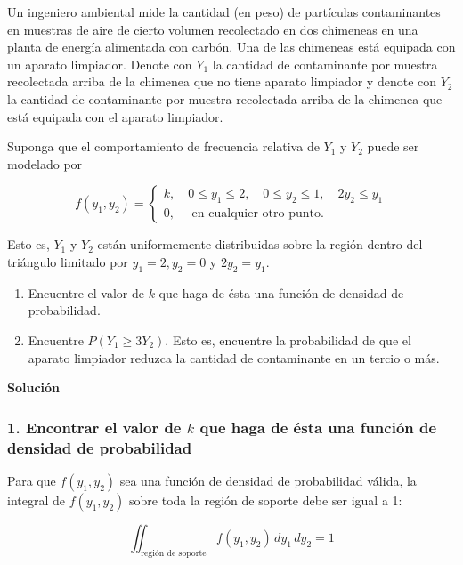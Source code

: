 \documentclass[
]{article}
\providecommand{\tightlist}{%
  \setlength{\itemsep}{0pt}\setlength{\parskip}{0pt}}
\begin{document}
Un ingeniero ambiental mide la cantidad (en peso) de partículas contaminantes en muestras de aire de cierto volumen recolectado en dos chimeneas en una planta de energía alimentada con carbón. Una de las chimeneas está equipada con un aparato limpiador. Denote con \(Y_{1}\) la cantidad de contaminante por muestra recolectada arriba de la chimenea que no tiene aparato limpiador y denote con \(Y_{2}\) la cantidad de contaminante por muestra recolectada arriba de la chimenea que está equipada con el aparato limpiador.

Suponga que el comportamiento de frecuencia relativa de \(Y_{1}\) y \(Y_{2}\) puede ser modelado por

\[
f\left(y_{1}, y_{2}\right)=\left\{\begin{array}{l}
k, \quad 0 \leq y_{1} \leq 2, \quad 0 \leq y_{2} \leq 1, \quad 2 y_{2} \leq y_{1} \\
0, \quad \text { en cualquier otro punto. }
\end{array}\right.
\]

Esto es, \(Y_{1}\) y \(Y_{2}\) están uniformemente distribuidas sobre la región dentro del triángulo limitado por \(y_{1}=2, y_{2}=0\) y \(2 y_{2}=y_{1}\).

\begin{enumerate}
\def\labelenumi{\arabic{enumi}.}
\tightlist
\item
  Encuentre el valor de \(k\) que haga de ésta una función de densidad de probabilidad.
\item
  Encuentre \(P\left(Y_{1} \geq 3 Y_{2}\right)\). Esto es, encuentre la probabilidad de que el aparato limpiador reduzca la cantidad de contaminante en un tercio o más.
\end{enumerate}

\textbf{Solución}

\subsubsection{\texorpdfstring{1. Encontrar el valor de \(k\) que haga de ésta una función de densidad de probabilidad}{1. Encontrar el valor de k que haga de ésta una función de densidad de probabilidad}}\label{encontrar-el-valor-de-k-que-haga-de-uxe9sta-una-funciuxf3n-de-densidad-de-probabilidad}

Para que \(f(y_1, y_2)\) sea una función de densidad de probabilidad válida, la integral de \(f(y_1, y_2)\) sobre toda la región de soporte debe ser igual a 1:

\[
\iint_{\text{región de soporte}} f(y_1, y_2) \, dy_1 \, dy_2 = 1
\]
\end{document}
